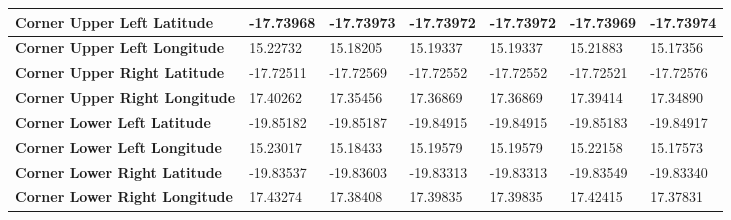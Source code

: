 \documentclass[draft]{agujournal2019}
\begin{document}
\begin{table}
{\begin{tabular}{|l|l|l|l|l|l|l|}
        \textbf{Corner Upper Left Latitude} & -17.73968 & -17.73973 & -17.73972 & -17.73972 & -17.73969 & -17.73974 \\ \hline
        \textbf{Corner Upper Left Longitude} & 15.22732 & 15.18205 & 15.19337 & 15.19337 & 15.21883 & 15.17356 \\ \hline
        \textbf{Corner Upper Right Latitude} & -17.72511 & -17.72569 & -17.72552 & -17.72552 & -17.72521 & -17.72576 \\ \hline
        \textbf{Corner Upper Right Longitude} & 17.40262 & 17.35456 & 17.36869 & 17.36869 & 17.39414 & 17.34890 \\ \hline
        \textbf{Corner Lower Left Latitude} & -19.85182 & -19.85187 & -19.84915 & -19.84915 & -19.85183 & -19.84917 \\ \hline
        \textbf{Corner Lower Left Longitude} & 15.23017 & 15.18433 & 15.19579 & 15.19579 & 15.22158 & 15.17573 \\ \hline
        \textbf{Corner Lower Right Latitude} & -19.83537 & -19.83603 & -19.83313 & -19.83313 & -19.83549 & -19.83340 \\ \hline
        \textbf{Corner Lower Right Longitude} & 17.43274 & 17.38408 & 17.39835 & 17.39835 & 17.42415 & 17.37831 \\ \hline
    \end{tabular}%
    }
  \end{table}
\end{document}
